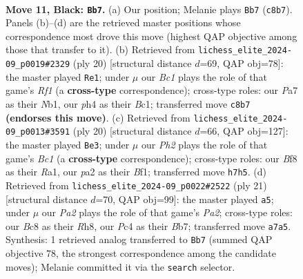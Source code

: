 \documentclass[11pt]{article}
\begin{document}
\clearpage

\begin{figure}[p]\centering
\begin{subfigure}{0.46\textwidth}\centering
\resizebox{\linewidth}{!}{%
\newchessgame
\chessboard[
  setfen={r1b1kbnr/p1pp1ppp/4q3/4P3/2p2PPP/2P5/PP2Q3/RNB1KB1R b KQkq - 0 11},
  showmover=false,
  pgfstyle=straightmove, color=movearrow, markmove={c8-b7}
]}
\caption{}
\end{subfigure}\hfill
\begin{subfigure}{0.46\textwidth}\centering
\resizebox{\linewidth}{!}{%
\newchessgame
\chessboard[
  setfen={r3kbnr/2pq1pp1/p1pp4/4P2p/3p4/5Q1P/PPP2PP1/RNB2RK1 w kq - 1 11},
  showmover=false,
  pgfstyle=straightmove, color=movearrow, markmove={f1-e1}
]}
\caption{}
\end{subfigure}
\\[4pt]
\begin{subfigure}{0.46\textwidth}\centering
\resizebox{\linewidth}{!}{%
\newchessgame
\chessboard[
  setfen={1nbqkb1r/r4pp1/p2p4/1p1Qp2p/4P3/6PP/PPP1NP2/R1B1KB1R w KQk - 1 11},
  showmover=false,
  pgfstyle=straightmove, color=movearrow, markmove={c1-e3}
]}
\caption{}
\end{subfigure}\hfill
\begin{subfigure}{0.46\textwidth}\centering
\resizebox{\linewidth}{!}{%
\newchessgame
\chessboard[
  setfen={r3kb1r/pbpp1ppp/1np1q3/4P3/2P2P2/1PN5/P3Q1PP/R1B1KB1R b KQkq - 0 11},
  showmover=false,
  pgfstyle=straightmove, color=movearrow, markmove={a7-a5}
]}
\caption{}
\end{subfigure}
\caption{\textbf{Move 11, Black: \texttt{Bb7}.} (a) Our position; Melanie plays \texttt{Bb7} (\texttt{c8b7}). Panels (b)--(d) are the retrieved master positions whose correspondence most drove this move (highest QAP objective among those that transfer to it). (b) Retrieved from \texttt{lichess\_elite\_2024-09\_p0019\#2329} (ply 20) [structural distance $d$=69, QAP obj=78]: the master played \texttt{Re1}; under $\mu$ our \emph{Bc1} plays the role of that game's \emph{Rf1} (a \textbf{cross-type} correspondence); cross-type roles: our \emph{P}a7 as their \emph{N}b1, our \emph{p}h4 as their \emph{B}c1; transferred move \texttt{c8b7} \textbf{(endorses this move)}. (c) Retrieved from \texttt{lichess\_elite\_2024-09\_p0013\#3591} (ply 20) [structural distance $d$=66, QAP obj=127]: the master played \texttt{Be3}; under $\mu$ our \emph{Ph2} plays the role of that game's \emph{Bc1} (a \textbf{cross-type} correspondence); cross-type roles: our \emph{B}f8 as their \emph{R}a1, our \emph{p}a2 as their \emph{B}f1; transferred move \texttt{h7h5}. (d) Retrieved from \texttt{lichess\_elite\_2024-09\_p0022\#2522} (ply 21) [structural distance $d$=70, QAP obj=99]: the master played \texttt{a5}; under $\mu$ our \emph{Pa2} plays the role of that game's \emph{Pa2}; cross-type roles: our \emph{B}c8 as their \emph{R}h8, our \emph{P}c4 as their \emph{B}b7; transferred move \texttt{a7a5}. Synthesis: 1 retrieved analog transferred to \texttt{Bb7} (summed QAP objective 78, the strongest correspondence among the candidate moves); Melanie committed it via the \texttt{search} selector.}
\label{fig:thought-m21}
\end{figure}
\end{document}
